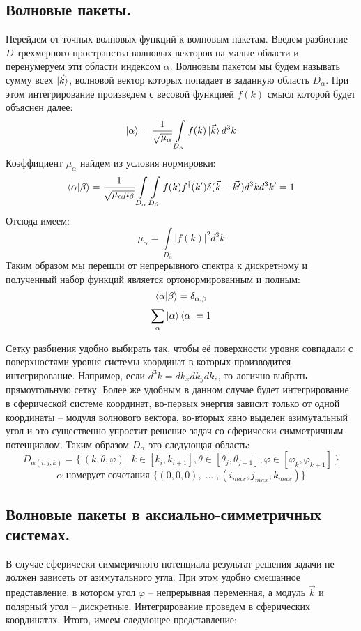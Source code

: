 \documentclass[a4paper,12pt]{article}
\begin{document}
	\subsection{Волновые пакеты.}
Перейдем от точных волновых функций к волновым пакетам. Введем разбиение $D$ трехмерного пространства волновых векторов на малые области и перенумеруем эти области индексом $\alpha$. Волновым пакетом мы будем называть сумму всех $\ket{\vec{k}}$, волновой вектор которых попадает в заданную область $D_\alpha$. При этом интегрирование произведем с весовой функцией $f(k)$ смысл которой будет объяснен далее:
\[
	\ket{\alpha} = \frac{1}{\sqrt{\mu_\alpha}} \int\limits_{D_\alpha} f(k) \ket{\vec{k}} d^3k
\]
Коэффициент $\mu_\alpha$ найдем из условия нормировки:
\[
	\braket{\alpha|\beta} = \frac{1}{\sqrt{\mu_\alpha \mu_\beta}}  \int\limits_{D_\alpha}  \int\limits_{D_\beta} f(k)f^\dagger(k') \delta(\vec{k} - \vec{k'}) d^3k d^3k' = 1
\]
Отсюда имеем:
\[
	\mu_\alpha =  \int\limits_{D_\alpha} |f(k)|^2 d^3k
\]
Таким образом мы перешли от непрерывного спектра к дискретному и полученный набор функций является ортонормированным и полным:
\[
	\braket{\alpha|\beta} = \delta_{\alpha,\beta}
\]\[
	\sum\limits_\alpha \ket{\alpha}\bra{\alpha} = 1
\]

Сетку разбиения удобно выбирать так, чтобы её поверхности уровня совпадали с поверхностями уровня системы координат в которых производится интегрирование. Например, если $d^3k = dk_xdk_ydk_z$, то логично выбрать прямоугольную сетку. Более же удобным в данном случае будет интегрирование в сферической системе координат, во-первых энергия зависит только от одной координаты – модуля волнового вектора, во-вторых явно выделен азимутальный угол и это существенно упростит решение задач со сферически-симметричным потенциалом. Таким образом $D_\alpha$ это следующая область:
\[
 D_{\alpha(i,j,k)} = \big\{ \: (k,\theta,\varphi) \: \big| \: k \in [k_i,k_{i+1}], \theta \in [\theta_j,\theta_{j+1}], \varphi \in [\varphi_k,\varphi_{k+1}] \: \big\} 
\]\[
 \alpha \text{ номерует сочетания } \big\{ (0,0,0), \; ... \; , (i_{max},j_{max},k_{max}) \big\}
\]

	\subsection{Волновые пакеты в аксиально-симметричных системах.}
В случае сферически-симмеричного потенциала результат решения задачи не должен зависеть от азимутального угла. При этом удобно смешанное представление, в котором угол $\varphi$ – непрерывная переменная, а модуль $\vec{k}$ и полярный угол – дискретные. Интегрирование проведем в сферических координатах. Итого, имеем следующее представление:
\end{document}
